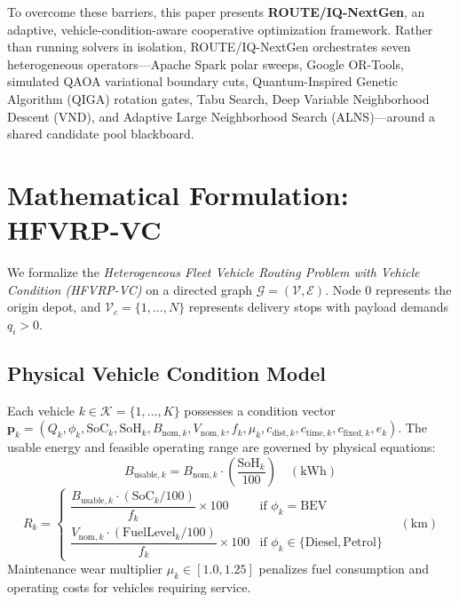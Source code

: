 \documentclass[journal,10pt]{IEEEtran}
\begin{document}
To overcome these barriers, this paper presents \textbf{ROUTE/IQ-NextGen}, an adaptive, vehicle-condition-aware cooperative optimization framework. Rather than running solvers in isolation, ROUTE/IQ-NextGen orchestrates seven heterogeneous operators---Apache Spark polar sweeps, Google OR-Tools, simulated QAOA variational boundary cuts, Quantum-Inspired Genetic Algorithm (QIGA) rotation gates, Tabu Search, Deep Variable Neighborhood Descent (VND), and Adaptive Large Neighborhood Search (ALNS)---around a shared candidate pool blackboard.

\section{Mathematical Formulation: HFVRP-VC}
We formalize the \textit{Heterogeneous Fleet Vehicle Routing Problem with Vehicle Condition (HFVRP-VC)} on a directed graph $\mathcal{G} = (\mathcal{V}, \mathcal{E})$. Node $0$ represents the origin depot, and $\mathcal{V}_c = \{1, \dots, N\}$ represents delivery stops with payload demands $q_i > 0$.

\subsection{Physical Vehicle Condition Model}
Each vehicle $k \in \mathcal{K} = \{1, \dots, K\}$ possesses a condition vector $\mathbf{p}_k = (Q_k, \phi_k, \text{SoC}_k, \text{SoH}_k, B_{\text{nom}, k}, V_{\text{nom}, k}, f_k, \mu_k, c_{\text{dist}, k}, c_{\text{time}, k}, c_{\text{fixed}, k}, e_k)$. The usable energy and feasible operating range are governed by physical equations:
\begin{equation}
B_{\text{usable}, k} = B_{\text{nom}, k} \cdot \left(\frac{\text{SoH}_k}{100}\right) \quad (\text{kWh})
\end{equation}
\begin{equation}
R_k = \begin{cases} 
\dfrac{B_{\text{usable}, k} \cdot (\text{SoC}_k / 100)}{f_k} \times 100 & \text{if } \phi_k = \text{BEV} \\[1.5ex]
\dfrac{V_{\text{nom}, k} \cdot (\text{FuelLevel}_k / 100)}{f_k} \times 100 & \text{if } \phi_k \in \{\text{Diesel}, \text{Petrol}\}
\end{cases} \quad (\text{km})
\end{equation}
Maintenance wear multiplier $\mu_k \in [1.0, 1.25]$ penalizes fuel consumption and operating costs for vehicles requiring service.
\end{document}
